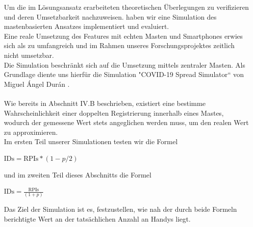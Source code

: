 \documentclass[conference]{IEEEtran}
\begin{document}
Um die im Lösungsansatz erarbeiteten theoretischen Überlegungen zu verifizieren und deren Umsetzbarkeit nachzuweisen. haben wir eine Simulation des mastenbasierten Ansatzes implementiert und evaluiert.\\
Eine reale Umsetzung des Features mit echten Masten und Smartphones erwies sich als zu umfangreich und im Rahmen unseres Forschungsprojektes zeitlich nicht umsetzbar.\\
Die Simulation beschränkt sich auf die Umsetzung mittels zentraler Masten. Als Grundlage diente uns hierfür die Simulation "COVID-19 Spread Simulator“ von Miguel Ángel Durán \cite{Simulation}. \\
\\
Wie bereits in Abschnitt IV.B beschrieben, existiert eine bestimme Wahrscheinlichkeit einer doppelten Registrierung innerhalb eines Mastes, wodurch der gemessene Wert stets angeglichen werden muss, um den realen Wert zu approximieren.\\
Im ersten Teil unserer Simulationen testen wir die Formel\\
\centerline{$\text{IDs} = \text{RPIs} * (1-p/2)$}
und im zweiten Teil dieses Abschnitts die Formel
\centerline{$\text{IDs} = \frac{\text{RPIs}}{(1+p)}$}

Das Ziel der Simulation ist es, festzustellen, wie nah der durch beide Formeln berichtigte Wert an der tatsächlichen Anzahl an Handys liegt.\\
\end{document}
